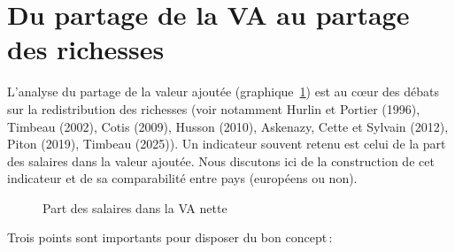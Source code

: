 \documentclass[
  french,
  9pt,
  a4paper,
]{article}
\begin{document}
\section{Du partage de la VA au partage des
richesses}\label{du-partage-de-la-va-au-partage-des-richesses}

L'analyse du partage de la valeur ajoutée (graphique~\ref{fig-psal}) est
au cœur des débats sur la redistribution des richesses (voir notamment
Hurlin et Portier (1996), Timbeau (2002), Cotis (2009), Husson (2010),
Askenazy, Cette et Sylvain (2012), Piton (2019), Timbeau (2025)). Un
indicateur souvent retenu est celui de la part des salaires dans la
valeur ajoutée. Nous discutons ici de la construction de cet indicateur
et de sa comparabilité entre pays (européens ou non).

\begin{figure}[H]

\caption{\label{fig-psal}Part des salaires dans la VA nette}


\end{figure}%

Trois points sont importants pour disposer du bon concept\,:
\end{document}
